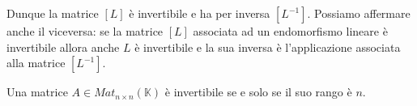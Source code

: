 Dunque la matrice $[L]$ \`e invertibile e ha per inversa $[L^{-1}]$.
Possiamo affermare anche il viceversa: se la matrice $[L]$ associata ad un
endomorfismo lineare \`e invertibile allora anche $L$ \`e invertibile e la sua
inversa \`e l'applicazione associata alla matrice $[L^{-1}]$.

\begin{corollary}
	Una matrice $A \in Mat_{n \times n}(\mathbb{K})$ \`e invertibile se e solo se
	il suo rango \`e $n$.
\end{corollary}